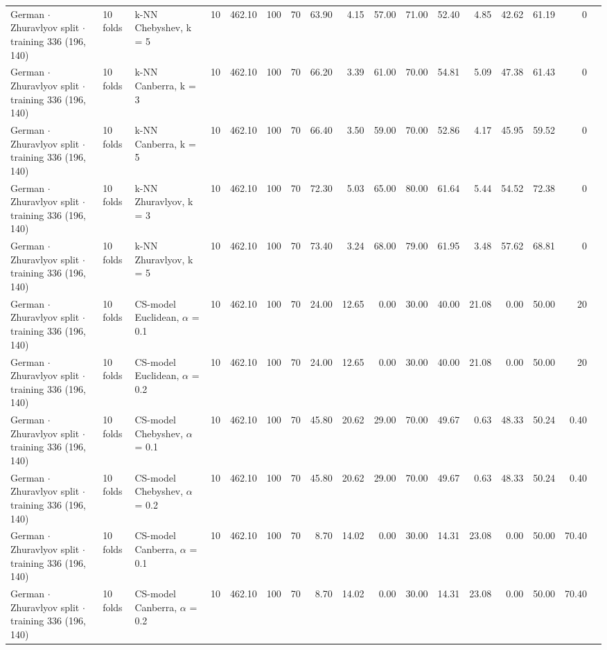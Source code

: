 \begin{longtable}{lllrrrrrrrrrrrrrl}
  German $\cdot$ Zhuravlyov split $\cdot$ training 336 (196, 140) & 10 folds & k-NN Chebyshev, k = 5 & 10 & 462.10 & 100 & 70 & 63.90 & 4.15 & 57.00 & 71.00 & 52.40 & 4.85 & 42.62 & 61.19 & 0 &  \\
  German $\cdot$ Zhuravlyov split $\cdot$ training 336 (196, 140) & 10 folds & k-NN Canberra, k = 3 & 10 & 462.10 & 100 & 70 & 66.20 & 3.39 & 61.00 & 70.00 & 54.81 & 5.09 & 47.38 & 61.43 & 0 &  \\
  German $\cdot$ Zhuravlyov split $\cdot$ training 336 (196, 140) & 10 folds & k-NN Canberra, k = 5 & 10 & 462.10 & 100 & 70 & 66.40 & 3.50 & 59.00 & 70.00 & 52.86 & 4.17 & 45.95 & 59.52 & 0 &  \\
  German $\cdot$ Zhuravlyov split $\cdot$ training 336 (196, 140) & 10 folds & k-NN Zhuravlyov, k = 3 & 10 & 462.10 & 100 & 70 & 72.30 & 5.03 & 65.00 & 80.00 & 61.64 & 5.44 & 54.52 & 72.38 & 0 &  \\
  German $\cdot$ Zhuravlyov split $\cdot$ training 336 (196, 140) & 10 folds & k-NN Zhuravlyov, k = 5 & 10 & 462.10 & 100 & 70 & 73.40 & 3.24 & 68.00 & 79.00 & 61.95 & 3.48 & 57.62 & 68.81 & 0 &  \\
  German $\cdot$ Zhuravlyov split $\cdot$ training 336 (196, 140) & 10 folds & CS-model Euclidean, $\alpha$ = 0.1 & 10 & 462.10 & 100 & 70 & 24.00 & 12.65 & 0.00 & 30.00 & 40.00 & 21.08 & 0.00 & 50.00 & 20 &  \\
  German $\cdot$ Zhuravlyov split $\cdot$ training 336 (196, 140) & 10 folds & CS-model Euclidean, $\alpha$ = 0.2 & 10 & 462.10 & 100 & 70 & 24.00 & 12.65 & 0.00 & 30.00 & 40.00 & 21.08 & 0.00 & 50.00 & 20 &  \\
  German $\cdot$ Zhuravlyov split $\cdot$ training 336 (196, 140) & 10 folds & CS-model Chebyshev, $\alpha$ = 0.1 & 10 & 462.10 & 100 & 70 & 45.80 & 20.62 & 29.00 & 70.00 & 49.67 & 0.63 & 48.33 & 50.24 & 0.40 &  \\
  German $\cdot$ Zhuravlyov split $\cdot$ training 336 (196, 140) & 10 folds & CS-model Chebyshev, $\alpha$ = 0.2 & 10 & 462.10 & 100 & 70 & 45.80 & 20.62 & 29.00 & 70.00 & 49.67 & 0.63 & 48.33 & 50.24 & 0.40 &  \\
  German $\cdot$ Zhuravlyov split $\cdot$ training 336 (196, 140) & 10 folds & CS-model Canberra, $\alpha$ = 0.1 & 10 & 462.10 & 100 & 70 & 8.70 & 14.02 & 0.00 & 30.00 & 14.31 & 23.08 & 0.00 & 50.00 & 70.40 &  \\
  German $\cdot$ Zhuravlyov split $\cdot$ training 336 (196, 140) & 10 folds & CS-model Canberra, $\alpha$ = 0.2 & 10 & 462.10 & 100 & 70 & 8.70 & 14.02 & 0.00 & 30.00 & 14.31 & 23.08 & 0.00 & 50.00 & 70.40 &  \\

\end{longtable}
